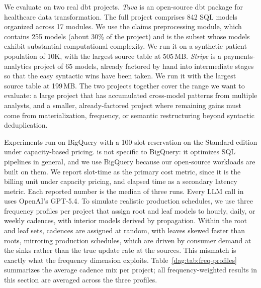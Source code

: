 We evaluate on two real dbt projects. \emph{Tuva} is an open-source dbt package for healthcare data transformation. The full project comprises 842 SQL models organized across 17 modules. We use the claims preprocessing module, which contains 255 models (about 30\% of the project) and is the subset whose models exhibit substantial computational complexity. We run it on a synthetic patient population of 10K, with the largest source table at 505\,MB. \emph{Stripe} is a payments-analytics project of 65 models, already factored by hand into intermediate stages so that the easy syntactic wins have been taken. We run it with the largest source table at 199\,MB. The two projects together cover the range we want to evaluate: a large project that has accumulated cross-model patterns from multiple analysts, and a smaller, already-factored project where remaining gains must come from materialization, frequency, or semantic restructuring beyond syntactic deduplication.

Experiments run on BigQuery with a 100-slot reservation on the Standard edition under capacity-based pricing.
\dagsmith{} is not specific to BigQuery: it optimizes SQL pipelines in general, and we use BigQuery because our open-source workloads are built on them. We report slot-time as the primary cost metric, since it is the billing unit under capacity pricing, and elapsed time as a secondary latency metric. Each reported number is the median of three runs. Every LLM call in \dagsmith{} uses OpenAI's GPT-5.4. To simulate realistic production schedules, we use three frequency profiles per project that assign root and leaf models to hourly, daily, or weekly cadences, with interior models derived by propagation. Within the root and leaf sets, cadences are assigned at random, with
leaves skewed faster than roots, mirroring production schedules, which
are driven by consumer demand at the sinks rather than the true update
rate at the sources. This mismatch is exactly what the frequency
dimension exploits. Table~\ref{dag:tab:freq-profiles} summarizes the average cadence mix per project; all frequency-weighted results in this section are averaged across the three profiles.

